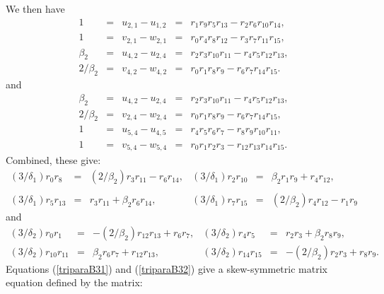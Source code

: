 \documentclass[letterpaper,10pt]{amsart}
\theoremstyle{definition}
\numberwithin{equation}{section}
\begin{document}
We then have
\begin{equation} \label{3diffB31} \begin{matrix} 
1 & = & u_{2,1} - u_{1,2} & = & r_1 r_9 r_5 r_{13} - r_2 r_{6} r_{10} r_{14}, \\
1 & = & v_{2,1} - w_{2,1} & = & r_0 r_4 r_8 r_{12} - r_3 r_7 r_{11} r_{15}, \\
\beta_2 & = & u_{4,2} - u_{2,4} & = & r_2 r_3 r_{10} r_{11} - r_4 r_5 r_{12} r_{13}, \\
2/\beta_2 & = & v_{4,2} - w_{4,2} & = & r_0 r_1 r_8 r_9 - r_6 r_7 r_{14} r_{15}.
\end{matrix} 
\end{equation}
and
\begin{equation} \label{3diffB32} \begin{matrix} 
\beta_2 & = & u_{4,2} - u_{2,4} & = & r_2 r_3 r_{10} r_{11} - r_4 r_5 r_{12} r_{13}, \\
2/\beta_2 & = & v_{2,4} - w_{2,4} & = & r_0 r_1 r_8 r_9 - r_6 r_7 r_{14} r_{15}, \\
1 & = & u_{5,4} - u_{4,5} & = & r_4 r_5 r_6 r_7 - r_8 r_9 r_{10} r_{11}, \\
1 & = & v_{5,4} - w_{5,4} & = & r_0 r_1 r_2 r_3 - r_{12} r_{13} r_{14} r_{15}.
\end{matrix} 
\end{equation}
Combined, these give:
\begin{equation} \label{triparaB31} \begin{matrix} (3/\delta_1) r_0 r_8 & = & (2/\beta_2) r_3 r_{11} - r_6 r_{14}, & (3/\delta_1) r_2 r_{10} & = & \beta_2 r_1 r_9 + r_4 r_{12}, \\ \\
(3/\delta_1) r_5 r_{13} & = & r_3 r_{11} + \beta_2 r_6 r_{14}, & (3/\delta_1) r_7 r_{15} & = & (2/\beta_2) r_4 r_{12} - r_1 r_9 
\end{matrix} 
\end{equation}
and
\begin{equation} \label{triparaB32} \begin{matrix} (3/\delta_2) r_0 r_1 & = & -(2/\beta_2) r_{12} r_{13} + r_6 r_7 , & (3/\delta_2) r_4 r_5 & = & r_2 r_3 + \beta_2 r_8 r_9, \\
(3/\delta_2) r_{10} r_{11} & = & \beta_2 r_6 r_7 + r_{12} r_{13}, & (3/\delta_2) r_{14} r_{15} & = & -(2/\beta_2) r_2 r_3 + r_8 r_9  . 
\end{matrix} 
\end{equation}
Equations (\ref{triparaB31}) and (\ref{triparaB32}) give a skew-symmetric matrix equation defined by the matrix:  
\end{document}
